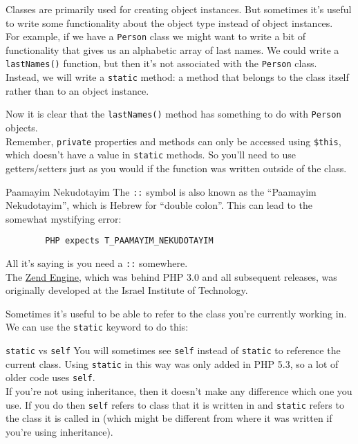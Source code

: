 Classes are primarily used for creating object instances. But sometimes it's useful to write some functionality about the object type instead of object instances.
\\

For example, if we have a \texttt{Person} class we might want to write a bit of functionality that gives us an alphabetic array of last names. We could write a \texttt{lastNames()} function, but then it's not associated with the \texttt{Person} class.
\\

Instead, we will write a \texttt{static} method: a method that belongs to the class itself rather than to an object instance.


Now it is clear that the \texttt{lastNames()} method has something to do with \texttt{Person} objects.
\\

Remember, \texttt{private} properties and methods can only be accessed using \texttt{\$this}, which doesn't have a value in \texttt{static} methods. So you'll need to use getters/setters just as you would if the function was written outside of the class.


\begin{infobox}{Paamayim Nekudotayim}
    The \texttt{::} symbol is also known as the ``Paamayim Nekudotayim'', which is Hebrew for ``double colon''. This can lead to the somewhat mystifying error:

    \begin{verbatim}
        PHP expects T_PAAMAYIM_NEKUDOTAYIM
    \end{verbatim}

    All it's saying is you need a \texttt{::} somewhere.
    \\

    The \href{https://en.wikipedia.org/wiki/Zend_Engine}{Zend Engine}, which was behind PHP 3.0 and all subsequent releases, was originally developed at the Israel Institute of Technology.
\end{infobox}

Sometimes it's useful to be able to refer to the class you're currently working in. We can use the \texttt{static} keyword to do this:


\begin{infobox}{\texttt{static} vs \texttt{self}}
    You will sometimes see \texttt{self} instead of \texttt{static} to reference the current class. Using \texttt{static} in this way was only added in PHP 5.3, so a lot of older code uses \texttt{self}.
    \\

    If you're not using inheritance, then it doesn't make any difference which one you use. If you do then \texttt{self} refers to class that it is written in and \texttt{static} refers to the class it is called in (which might be different from where it was written if you're using inheritance).
\end{infobox}

